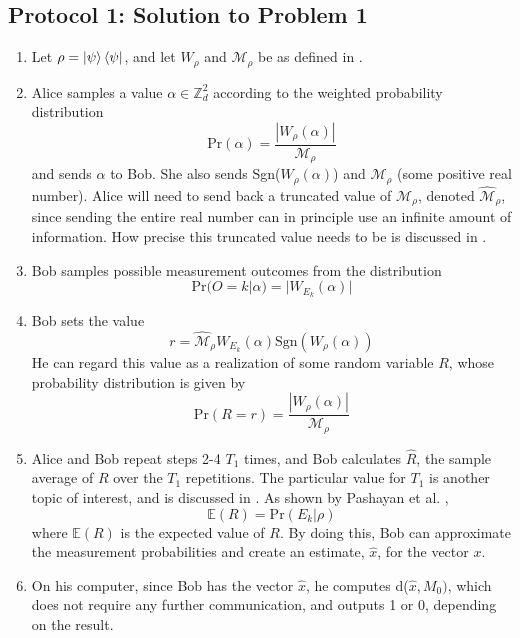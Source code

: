 \documentclass[../3Wworkreport.tex]{subfiles}
\begin{document}
\newpage
\subsection{Protocol 1: Solution to Problem 1}
\label{app:protocol1}
\begin{enumerate}
	\item
		Let $\rho = \ket{\psi}\bra{\psi}$, and let $W_\rho$ and $\mathcal{M}_\rho$ be as defined in .
	\item
		Alice samples a value $\alpha \in \mathbb{Z}_d^2$ according to the weighted probability distribution 
		\begin{equation}
			\text{Pr}(\alpha) = \frac{|W_\rho(\alpha)|}{\mathcal{M}_\rho}
		\end{equation}
		and sends $\alpha$ to Bob. She also sends Sgn($W_\rho(\alpha)$) and $\mathcal{M}_\rho$ (some positive real number). Alice will need to send back a truncated value of $\mathcal{M}_\rho$, denoted $\hat{\mathcal{M}}_\rho$, since sending the entire real number can in principle use an infinite amount of information. How precise this truncated value needs to be is discussed in .

	\item
		Bob samples possible measurement outcomes from the distribution
		\begin{equation}
			\text{Pr}(O = k | \alpha) = |W_{E_k}(\alpha)|
		\end{equation}

	\item
		Bob sets the value
		\begin{equation}
			r = \hat{\mathcal{M}}_\rho W_{E_k}(\alpha) \text{Sgn}(W_\rho(\alpha))
		\end{equation}
		He can regard this value as a realization of some random variable $R$, whose probability distribution is given by
		\begin{equation}
			\text{Pr}(R = r) = \frac{|W_\rho(\alpha)|}{\mathcal{M}_\rho}
		\end{equation}

	\item
		Alice and Bob repeat steps 2-4 $T_1$ times, and Bob calculates $\hat{R}$, the sample average of $R$ over the $T_1$ repetitions. The particular value for $T_1$ is another topic of interest, and is discussed in . As shown by Pashayan et al. \parencite*{Pashayan2014},
		\begin{equation}
			\mathbb{E}(R) = \text{Pr}(E_k| \rho)
		\end{equation}
		where $\mathbb{E}(R)$ is the expected value of $R$. By doing this, Bob can approximate the measurement probabilities and create an estimate, $\hat{x}$, for the vector $x$.

	\item
		On his computer, since Bob has the vector $\hat{x}$, he computes d($\hat{x}, M_0)$, which does not require any further communication, and outputs 1 or 0, depending on the result.
\end{enumerate}
\end{document}
